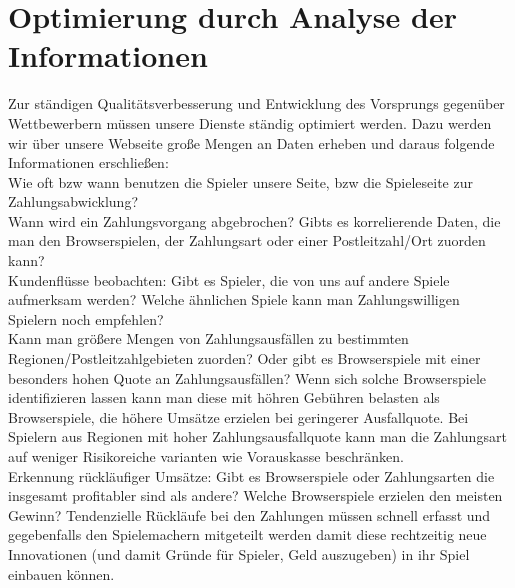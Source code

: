 \documentclass[a4paper,10pt]{article}
\begin{document}
\section{Optimierung durch Analyse der Informationen}\label{labelRelDaten}


Zur ständigen Qualitätsverbesserung und Entwicklung des Vorsprungs gegenüber Wettbewerbern müssen unsere Dienste ständig optimiert werden.
Dazu werden wir über unsere Webseite große Mengen an Daten erheben und daraus folgende Informationen erschließen:\\
Wie oft bzw wann benutzen die Spieler unsere Seite, bzw die Spieleseite zur Zahlungsabwicklung?\\
Wann wird ein Zahlungsvorgang abgebrochen? Gibts es korrelierende Daten, die man den Browserspielen, der Zahlungsart oder einer Postleitzahl/Ort zuorden kann?\\
Kundenflüsse beobachten: Gibt es Spieler, die von uns auf andere Spiele aufmerksam werden? Welche ähnlichen Spiele kann man Zahlungswilligen Spielern noch empfehlen?\\
Kann man größere Mengen von Zahlungsausfällen zu bestimmten Regionen/Postleitzahlgebieten zuorden? Oder gibt es Browserspiele mit einer besonders hohen Quote an Zahlungsausfällen?
Wenn sich solche Browserspiele identifizieren lassen kann man diese mit höhren Gebühren belasten als Browserspiele, die höhere Umsätze erzielen bei geringerer Ausfallquote.
Bei Spielern aus Regionen mit hoher Zahlungsausfallquote kann man die Zahlungsart auf weniger Risikoreiche varianten wie Vorauskasse beschränken.\\
Erkennung rückläufiger Umsätze: Gibt es Browserspiele oder Zahlungsarten die insgesamt profitabler sind als andere? Welche Browserspiele erzielen den meisten Gewinn?
Tendenzielle Rückläufe bei den Zahlungen müssen schnell erfasst und gegebenfalls den Spielemachern mitgeteilt werden damit diese rechtzeitig neue Innovationen (und damit Gründe für Spieler,
Geld auszugeben) in ihr Spiel einbauen können.
\end{document}
